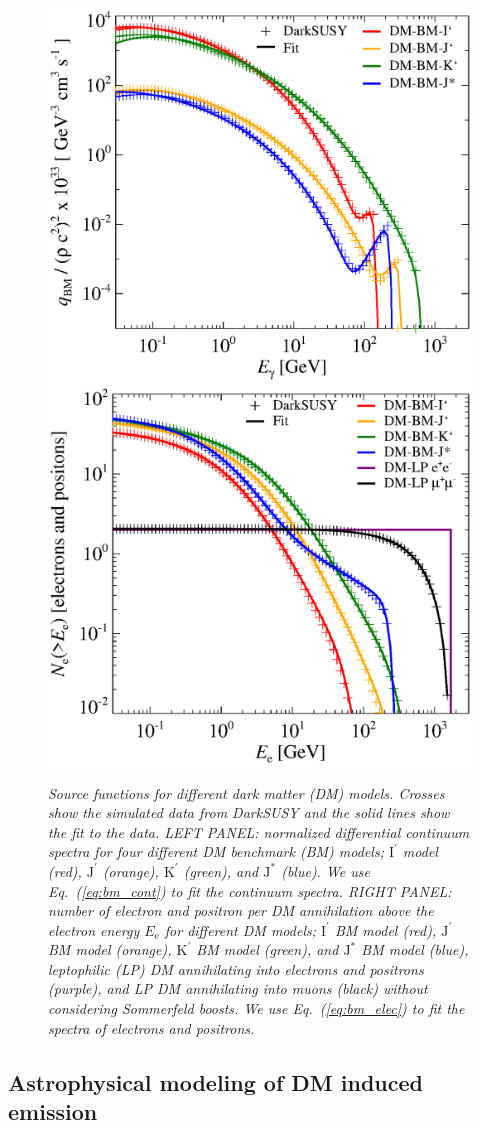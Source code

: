 \documentclass[10pt,aps,pra,reprint,amsmath,amsfonts,amssymb,showpacs,nofootinbib,floatfix]{revtex4-1}
\newcommand{\rmn}{\mathrm}
\newcommand{\ee}{E_\rmn{e}}
\newcommand{\Kp}{\rmn{K}^\prime}
\newcommand{\Ip}{\rmn{I}^\prime}
\newcommand{\Js}{\rmn{J}^*}
\newcommand{\Jp}{\rmn{J}^\prime}
\begin{document}
\begin{figure}
\begin{minipage}{2.0\columnwidth}
 \includegraphics[width=0.49\columnwidth]{figures/fit.ds.flux.eps}
 \includegraphics[width=0.49\columnwidth]{figures/fit.epflux.int.eps}
 \caption{\it Source functions for different dark matter (DM)
   models. Crosses show the simulated data from {\sc DarkSUSY} and the
   solid lines show the fit to the data. LEFT PANEL: normalized
   differential continuum spectra for four different DM benchmark (BM)
   models; $\Ip$ model (red), $\Jp$ (orange), $\Kp$ (green), and $\Js$
   (blue). We use Eq.~(\ref{eq:bm_cont}) to fit the continuum
   spectra. RIGHT PANEL: number of electron and positron per DM
   annihilation above the electron energy $\ee$ for different DM
   models; $\Ip$ BM model (red), $\Jp$ BM model (orange), $\Kp$ BM
   model (green), and $\Js$ BM model (blue), leptophilic (LP) DM
   annihilating into electrons and positrons (purple), and LP DM
   annihilating into muons (black) without considering Sommerfeld
   boosts. We use Eq.~(\ref{eq:bm_elec}) to fit the spectra of
   electrons and positrons.}
 \label{fig:q_DM}
\end{minipage}
\end{figure}


\subsection{Astrophysical modeling of DM induced emission}
\label{sect:AP}
\end{document}
